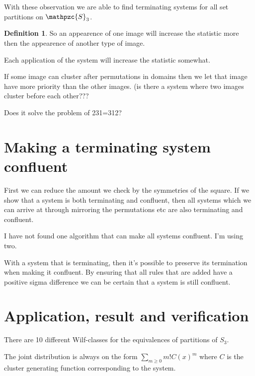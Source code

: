 \documentclass[a4paper, 11pt]{article}
\theoremstyle{definition}
\newtheorem{definition}[theorem]{Definition}
\newcommand{\Sym}{\mathpzc{S}}
\begin{document}
With these observation we are able to find terminating systems for all set
partitions on $\Sym_3$.

\begin{definition}
    So an appearence of one image will increase the statistic more then the
    appearence of another type of image.

    Each application of the system will increase the statistic somewhat.

    If some image can cluster after permutations in domains then we let that
    image have more priority than the other images. (is there a system where two
    images cluster before each other???

    Does it solve the problem of 231=312?
\end{definition}

\section{Making a terminating system confluent}
First we can reduce the amount we check by the symmetries of the square.
If we show that a system is both terminating and confluent, then all systems
which we can arrive at through mirroring the permutations etc are also
terminating and confluent.

I have not found one algorithm that can make all systems confluent.
I'm using two.

With a system that is terminating, then it's possible to preserve its
termination when making it confluent.
By ensuring that all rules that are added have a positive sigma difference
we can be certain that a system is still confluent. 


\section{Application, result and verification}
There are 10 different Wilf-classes for the equivalences of partitions of $S_3$.

The joint distribution is always on the form $\sum_{m \geq 0}m!C(x)^m$ where $C$
is the cluster generating function corresponding to the system.
\end{document}
